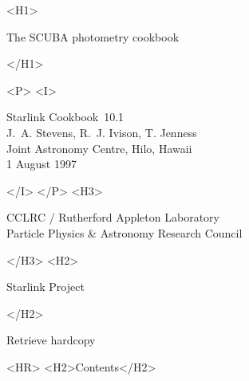 \documentclass[twoside,11pt,fleqn]{article}
\newcommand{\stardoccategory}  {Starlink Cookbook}
\newcommand{\stardocsource}    {sc\stardocnumber}
\newcommand{\stardocnumber}    {10.1}
\newcommand{\stardocauthors}   {J.~A. Stevens, R.~J. Ivison, T. Jenness\\
                                Joint Astronomy Centre, Hilo, Hawaii}
\newcommand{\stardocdate}      {1 August 1997}
\newcommand{\stardoctitle}     {The SCUBA photometry cookbook}
\newcommand{\stardocversion}   {\ }
\newcommand{\stardocmanual}    {\ }
\newcommand{\htmladdnormallink}[2]{#1}
\newcommand{\htmladdimg}[1]{}
\newcommand{\htmlref}[2]{#1}
\newcommand{\htmladdtonavigation}[1]{}
\newcommand{\xlabel}[1]{}
\newcommand{\latexonlytoc}[0]{\tableofcontents}
\begin{document}
\begin{htmlonly}
   \xlabel{}
   \begin{rawhtml} <H1> \end{rawhtml}
      \stardoctitle\\
   \begin{rawhtml} </H1> \end{rawhtml}
 
 
   \begin{rawhtml} <P> <I> \end{rawhtml}
   \stardoccategory\ \stardocnumber \\
   \stardocauthors \\
   \stardocdate
   \begin{rawhtml} </I> </P> <H3> \end{rawhtml}
      \htmladdnormallink{CCLRC}{http://www.cclrc.ac.uk} /
      \htmladdnormallink{Rutherford Appleton Laboratory}
                        {http://www.cclrc.ac.uk/ral} \\
      \htmladdnormallink{Particle Physics \& Astronomy Research Council}
                        {http://www.pparc.ac.uk} \\
   \begin{rawhtml} </H3> <H2> \end{rawhtml}
      \htmladdnormallink{Starlink Project}{http://star-www.rl.ac.uk/}
   \begin{rawhtml} </H2> \end{rawhtml}
   \htmladdnormallink{\htmladdimg{source.gif} Retrieve hardcopy}
      {http://star-www.rl.ac.uk/cgi-bin/hcserver?\stardocsource}\\
 
  \label{stardoccontents}
  \begin{rawhtml} 
    <HR>
    <H2>Contents</H2>
  \end{rawhtml}
  \newcommand{\latexonlytoc}[0]{}
  \htmladdtonavigation{\htmlref{\htmladdimg{contents_motif.gif}}
        {stardoccontents}}
 
\end{htmlonly}
 
\end{document}
